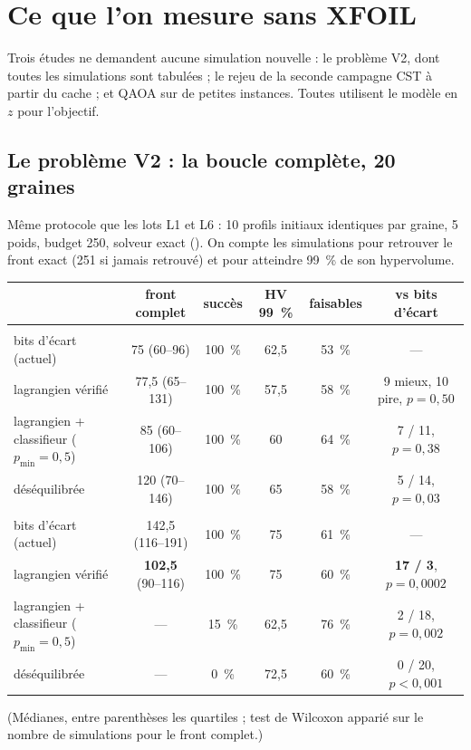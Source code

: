 \chapter{Ce que l'on mesure sans XFOIL}\label{ch:hors-ligne}

Trois études ne demandent aucune simulation nouvelle : le problème V2, dont toutes les simulations sont tabulées ; le rejeu de la seconde campagne CST à partir du cache ; et QAOA sur de petites instances. Toutes utilisent le modèle en $z$ pour l'objectif.

\section{Le problème V2 : la boucle complète, 20 graines}
Même protocole que les lots L1 et L6 : 10 profils initiaux identiques par graine, 5 poids, budget 250, solveur exact (). On compte les simulations pour retrouver le front exact (251 si jamais retrouvé) et pour atteindre 99~\% de son hypervolume.
\begin{center}
\renewcommand{\arraystretch}{1.2}
\small
\begin{tabularx}{\linewidth}{>{\raggedright\arraybackslash}X c c c c c}
\toprule
& front complet & succès & HV 99~\% & faisables & vs bits d'écart \\
\midrule
\multicolumn{6}{l}{\textit{S1 (front exact : 4 profils)}}\\
bits d'écart (actuel) & 75 (60--96) & 100~\% & 62,5 & 53~\% & --- \\
lagrangien vérifié & 77,5 (65--131) & 100~\% & 57,5 & 58~\% & 9 mieux, 10 pire, $p=0{,}50$ \\
lagrangien + classifieur ($p_{\min}=0{,}5$) & 85 (60--106) & 100~\% & 60 & 64~\% & 7 / 11, $p=0{,}38$ \\
déséquilibrée & 120 (70--146) & 100~\% & 65 & 58~\% & 5 / 14, $p=0{,}03$ \\
\midrule
\multicolumn{6}{l}{\textit{S2 (front exact : 10 profils)}}\\
bits d'écart (actuel) & 142,5 (116--191) & 100~\% & 75 & 61~\% & --- \\
lagrangien vérifié & \textbf{102,5} (90--116) & 100~\% & 75 & 60~\% & \textbf{17 / 3}, $p=0{,}0002$ \\
lagrangien + classifieur ($p_{\min}=0{,}5$) & --- & 15~\% & 62,5 & 76~\% & 2 / 18, $p=0{,}002$ \\
déséquilibrée & --- & 0~\% & 72,5 & 60~\% & 0 / 20, $p<0{,}001$ \\
\bottomrule
\end{tabularx}
\end{center}
(Médianes, entre parenthèses les quartiles ; test de Wilcoxon apparié sur le nombre de simulations pour le front complet.)

